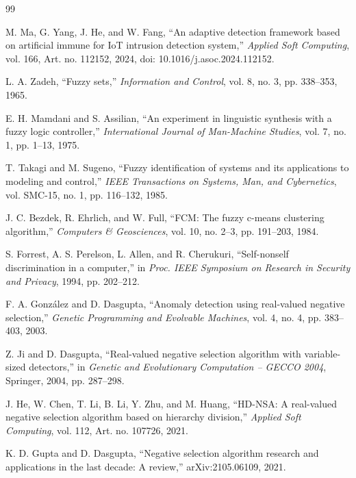 \documentclass[11pt,a4paper]{article}
\begin{document}
\begin{thebibliography}{99}\footnotesize
\setlength{\itemsep}{0pt}

 M. Ma, G. Yang, J. He, and W. Fang, ``An adaptive detection framework based on artificial immune for IoT intrusion detection system,'' \emph{Applied Soft Computing}, vol. 166, Art. no. 112152, 2024, doi: 10.1016/j.asoc.2024.112152.

 L. A. Zadeh, ``Fuzzy sets,'' \emph{Information and Control}, vol. 8, no. 3, pp. 338--353, 1965.

 E. H. Mamdani and S. Assilian, ``An experiment in linguistic synthesis with a fuzzy logic controller,'' \emph{International Journal of Man-Machine Studies}, vol. 7, no. 1, pp. 1--13, 1975.

 T. Takagi and M. Sugeno, ``Fuzzy identification of systems and its applications to modeling and control,'' \emph{IEEE Transactions on Systems, Man, and Cybernetics}, vol. SMC-15, no. 1, pp. 116--132, 1985.

 J. C. Bezdek, R. Ehrlich, and W. Full, ``FCM: The fuzzy c-means clustering algorithm,'' \emph{Computers \& Geosciences}, vol. 10, no. 2--3, pp. 191--203, 1984.

 S. Forrest, A. S. Perelson, L. Allen, and R. Cherukuri, ``Self-nonself discrimination in a computer,'' in \emph{Proc. IEEE Symposium on Research in Security and Privacy}, 1994, pp. 202--212.

 F. A. González and D. Dasgupta, ``Anomaly detection using real-valued negative selection,'' \emph{Genetic Programming and Evolvable Machines}, vol. 4, no. 4, pp. 383--403, 2003.

 Z. Ji and D. Dasgupta, ``Real-valued negative selection algorithm with variable-sized detectors,'' in \emph{Genetic and Evolutionary Computation -- GECCO 2004}, Springer, 2004, pp. 287--298.

 J. He, W. Chen, T. Li, B. Li, Y. Zhu, and M. Huang, ``HD-NSA: A real-valued negative selection algorithm based on hierarchy division,'' \emph{Applied Soft Computing}, vol. 112, Art. no. 107726, 2021.

 K. D. Gupta and D. Dasgupta, ``Negative selection algorithm research and applications in the last decade: A review,'' arXiv:2105.06109, 2021.


\end{thebibliography}
\end{document}

